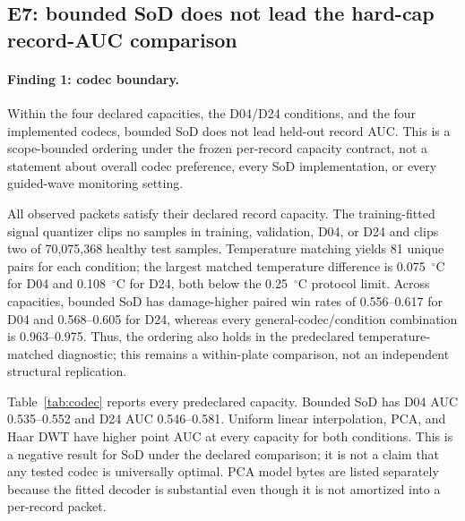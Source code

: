 \subsection{E7: bounded SoD does not lead the hard-cap record-AUC comparison}
\paragraph{Finding 1: codec boundary.}
Within the four declared capacities, the D04/D24 conditions, and the four
implemented codecs, bounded SoD does not lead held-out record AUC. This is a
scope-bounded ordering under the frozen per-record capacity contract, not a
statement about overall codec preference, every SoD implementation, or every
guided-wave monitoring setting.

All observed packets satisfy their declared record capacity. The
training-fitted signal quantizer clips no samples in training, validation,
D04, or D24 and clips two of 70,075,368 healthy test samples. Temperature
matching yields 81 unique pairs for each condition; the largest matched
temperature difference is 0.075~$^\circ$C for D04 and 0.108~$^\circ$C for
D24, both below the 0.25~$^\circ$C protocol limit. Across capacities,
bounded SoD has damage-higher paired win rates of 0.556--0.617 for D04 and
0.568--0.605 for D24, whereas every general-codec/condition combination is
0.963--0.975. Thus, the ordering also holds in the predeclared
temperature-matched diagnostic; this remains a within-plate comparison, not
an independent structural replication.

Table~\ref{tab:codec} reports every predeclared capacity. Bounded SoD has
D04 AUC 0.535--0.552 and D24 AUC 0.546--0.581. Uniform linear interpolation,
PCA, and Haar DWT have higher point AUC at every capacity for both conditions.
This is a negative result for SoD under the declared comparison; it is not a
claim that any tested codec is universally optimal. PCA model bytes are
listed separately because the fitted decoder is substantial even though it is
not amortized into a per-record packet.

